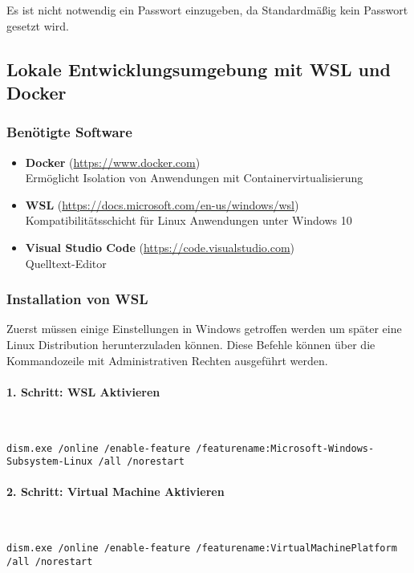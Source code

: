 Es ist nicht notwendig ein Passwort einzugeben, da Standardmäßig kein Passwort
gesetzt wird.

\subsection{Lokale Entwicklungsumgebung mit WSL und Docker}

\subsubsection{Benötigte Software}

\begin{itemize}
  \item \textbf{Docker} (\url{https://www.docker.com}) \\ Ermöglicht Isolation
        von Anwendungen mit Containervirtualisierung
  \item \textbf{WSL} (\url{https://docs.microsoft.com/en-us/windows/wsl}) \\
        Kompatibilitätsschicht für Linux Anwendungen unter Windows 10
  \item \textbf{Visual Studio Code} (\url{https://code.visualstudio.com}) \\
        Quelltext-Editor
\end{itemize}

\subsubsection{Installation von WSL}
Zuerst müssen einige Einstellungen in Windows getroffen werden um später eine
Linux Distribution herunterzuladen können. Diese Befehle können über die
Kommandozeile mit Administrativen Rechten ausgeführt werden.

\paragraph{1. Schritt: WSL Aktivieren}\mbox{}\\
\begin{lstlisting}[caption={WSL Feature Feature aktivierens}]
  dism.exe /online /enable-feature /featurename:Microsoft-Windows-Subsystem-Linux /all /norestart
\end{lstlisting}

\paragraph{2. Schritt: Virtual Machine Aktivieren}\mbox{}\\
\begin{lstlisting}[caption={Virtual Machine Feature aktivieren}]
  dism.exe /online /enable-feature /featurename:VirtualMachinePlatform /all /norestart
\end{lstlisting}


